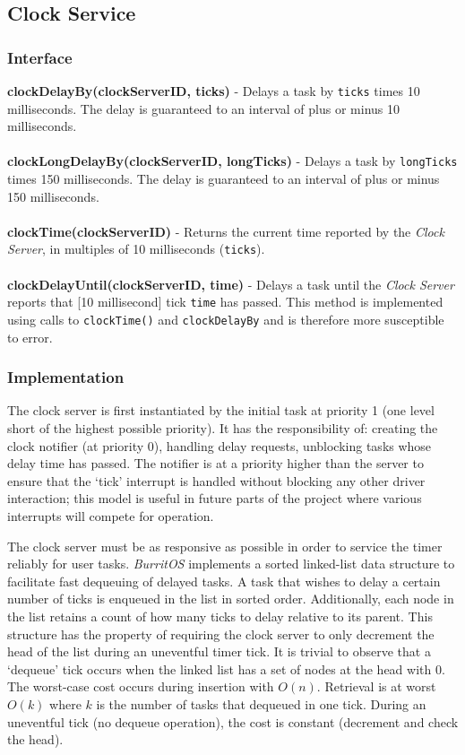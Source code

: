 \documentclass[twoside,a4paper]{refart}
\begin{document}
\subsection{Clock Service}

\subsubsection{Interface}
\textbf{clockDelayBy(clockServerID, ticks)} - Delays a task by \verb~ticks~ times 10 milliseconds. The delay is guaranteed to an interval of plus or minus 10 milliseconds.\\\\
\textbf{clockLongDelayBy(clockServerID, longTicks)} - Delays a task by \verb~longTicks~ times 150 milliseconds. The delay is guaranteed to an interval of plus or minus 150 milliseconds.\\\\
\textbf{clockTime(clockServerID)} - Returns the current time reported by the \textit{Clock Server}, in multiples of 10 milliseconds (\verb~ticks~).\\\\
\textbf{clockDelayUntil(clockServerID, time)} - Delays a task until the \textit{Clock Server} reports that [10 millisecond] tick \verb~time~ has passed. This method is implemented using calls to \verb~clockTime()~ and \verb~clockDelayBy~ and is therefore more susceptible to error.

\subsubsection{Implementation}
The clock server is first instantiated by the initial task at priority 1 (one level short of the highest possible priority). It has the responsibility of: creating the clock notifier (at priority 0), handling delay requests, unblocking tasks whose delay time has passed. The notifier is at a priority higher than the server to ensure that the ‘tick’ interrupt is handled without blocking any other driver interaction; this model is useful in future parts of the project where various interrupts will compete for operation.

The clock server must be as responsive as possible in order to service the timer reliably for user tasks. \textit{BurritOS} implements a sorted linked-list data structure to facilitate fast dequeuing of delayed tasks. A task that wishes to delay a certain number of ticks is enqueued in the list in sorted order. Additionally, each node in the list retains a count of how many ticks to delay relative to its parent. This structure has the property of requiring the clock server to only decrement the head of the list during an uneventful timer tick. It is trivial to observe that a ‘dequeue’ tick occurs when the linked list has a set of nodes at the head with 0. The worst-case cost occurs during insertion with $O(n)$. Retrieval is at worst $O(k)$ where $k$ is the number of tasks that dequeued in one tick. During an uneventful tick (no dequeue operation), the cost is constant (decrement and check the head).
\end{document}
